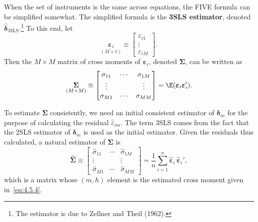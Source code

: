 When the set of instruments is the same across equations, the FIVE formula can
be simplified somewhat. The simplified formula is the \textbf{3SLS estimator},
denoted $\hat{\boldsymbol{\delta}}_{\mathrm{3SLS}}$.\footnote{The estimator is due to
Zellner and Theil (1962).}
To this end, let
\begin{equation}
\underset{(M \times 1)}{\boldsymbol{\varepsilon}_i}
\equiv \begin{bmatrix} \varepsilon_{i1} \\ \vdots \\ \varepsilon_{iM} \end{bmatrix}.
\label{eq:4.5.5}
\end{equation}
Then the $M \times M$ matrix of cross moments of $\boldsymbol{\varepsilon}_i$, denoted
$\boldsymbol{\Sigma}$, can be written as
\begin{equation}
\underset{(M \times M)}{\boldsymbol{\Sigma}}
\equiv \begin{bmatrix}
\sigma_{11} & \cdots & \sigma_{1M} \\
\vdots & & \vdots \\
\sigma_{M1} & \cdots & \sigma_{MM}
\end{bmatrix}
= \E(\boldsymbol{\varepsilon}_i \boldsymbol{\varepsilon}_i').
\label{eq:4.5.6}
\end{equation}

To estimate $\boldsymbol{\Sigma}$ consistently, we need an initial consistent estimator of
$\boldsymbol{\delta}_m$ for the purpose of calculating the residual $\hat{\varepsilon}_{im}$.
The term 3SLS comes from the fact that the 2SLS estimator of $\boldsymbol{\delta}_m$
is used as the initial estimator. Given the residuals thus calculated, a natural
estimator of $\boldsymbol{\Sigma}$ is
\begin{equation}
\widehat{\boldsymbol{\Sigma}}
\equiv \begin{bmatrix}
\hat{\sigma}_{11} & \cdots & \hat{\sigma}_{1M} \\
\vdots & & \vdots \\
\hat{\sigma}_{M1} & \cdots & \hat{\sigma}_{MM}
\end{bmatrix}
= \frac{1}{n} \sum_{i=1}^{n} \hat{\boldsymbol{\varepsilon}}_i\,
\hat{\boldsymbol{\varepsilon}}_i',
\label{eq:4.5.7}
\end{equation}
which is a matrix whose $(m,h)$ element is the estimated cross moment given
in~\eqref{eq:4.5.4}.

